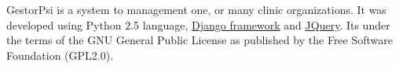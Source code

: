 
GestorPsi is a system to management one, or many clinic organizations. It was developed using Python 2.5
language, \href{www.djangoproject.com}{Django framework} and \href{www.jquery.com}{JQuery}. Its
under the terms of the GNU General Public License as published by the Free Software Foundation (GPL2.0).

